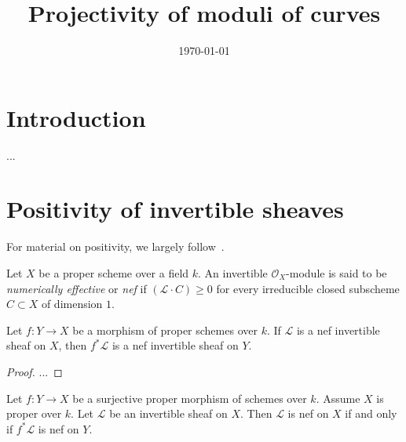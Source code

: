 


\date{\today}

\title{Projectivity of moduli of curves}
\maketitle
\tableofcontents

\section{Introduction}
\label{section-introduction}
...

\section{Positivity of invertible sheaves}
\label{section-positivity}
For material on positivity, we largely follow~\cite{lazI,lazII}.

\begin{definition}
\label{definition-nef-invertible-sheaf}
Let $X$ be a proper scheme over a field $k$.
An invertible $\mathcal{O}_X$-module is said to be \emph{numerically effective}
or \emph{nef} if $(\mathcal{L} \cdot C) \geq 0$ for every irreducible closed
subscheme $C \subset X$ of dimension $1$.
\end{definition}

\begin{lemma}
\label{lemma-nef-pullback-nef}
\begin{reference}
\cite[Example 1.4.4(i)]{lazI}
\end{reference}
Let $f : Y \to X$ be a morphism of proper schemes over $k$.
If $\mathcal{L}$ is a nef invertible sheaf on $X$,
then $f^*\mathcal{L}$ is a nef invertible sheaf on $Y$.
\end{lemma}

\begin{proof}
...
\end{proof}

\begin{lemma}
\label{lemma-nef-proper-surjective-nef}
\begin{reference}
\cite[Example 1.4.4(ii)]{lazI}
\end{reference}
Let $f : Y \to X$ be a surjective proper morphism of schemes over $k$.
Assume $X$ is proper over $k$.
Let $\mathcal{L}$ be an invertible sheaf on $X$.
Then $\mathcal{L}$ is nef on $X$ if and only if $f^*\mathcal{L}$ is nef on $Y$.
\end{lemma}

